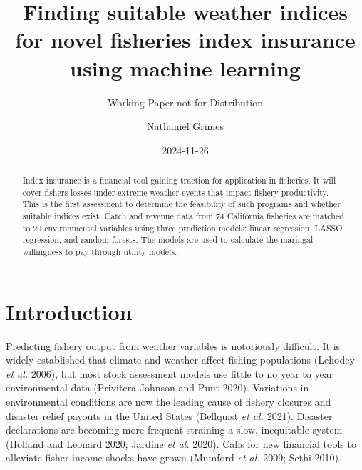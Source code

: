 \documentclass[
  letterpaper,
  DIV=11,
  numbers=noendperiod]{scrartcl}
\title{Finding suitable weather indices for novel fisheries index
insurance using machine learning}
\subtitle{Working Paper not for Distribution}
\author{Nathaniel Grimes}
\date{2024-11-26}
\renewcommand*\contentsname{Table of contents}
\newcommand\contentsname{Table of contents}
\begin{document}
\maketitle
\begin{abstract}
Index insurance is a financial tool gaining traction for application in
fisheries. It will cover fishers losses under extreme weather events
that impact fishery productivity. This is the first assessment to
determine the feasibility of such programs and whether suitable indices
exist. Catch and revenue data from 74 California fisheries are matched
to 20 environmental variables using three prediction models: linear
regression, LASSO regression, and random forests. The models are used to
calculate the maringal willingness to pay through utility models.
\end{abstract}
\ifdefined\Shaded\renewenvironment{Shaded}{\begin{tcolorbox}[frame hidden, boxrule=0pt, enhanced, interior hidden, borderline west={3pt}{0pt}{shadecolor}, breakable, sharp corners]}{\end{tcolorbox}}\fi

\renewcommand*\contentsname{Table of contents}
{
\hypersetup{linkcolor=}
\setcounter{tocdepth}{3}
\tableofcontents
}
\hypertarget{introduction}{%
\section{Introduction}\label{introduction}}

Predicting fishery output from weather variables is notoriously
difficult. It is widely established that climate and weather affect
fishing populations (Lehodey \emph{et al.} 2006), but most stock
assessment models use little to no year to year environmental data
(Privitera-Johnson and Punt 2020). Variations in environmental
conditions are now the leading cause of fishery closures and disaster
relief payouts in the United States (Bellquist \emph{et al.} 2021).
Disaster declarations are becoming more frequent straining a slow,
inequitable system (Holland and Leonard 2020; Jardine \emph{et al.}
2020). Calls for new financial tools to alleviate fisher income shocks
have grown (Mumford \emph{et al.} 2009; Sethi 2010).
\end{document}

